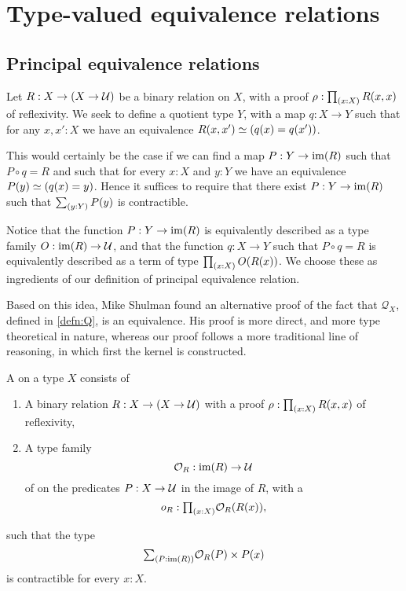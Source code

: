 \chapter{Type-valued equivalence relations}

\section{Principal equivalence relations}

Let $R: X\to (X\to\mathcal{U})$ be a binary relation on $X$, with a proof $\rho:\prd{x:X}R(x,x)$ of reflexivity. We seek to define a quotient type $Y$, with a map $q : X\to Y$ such that for any $x,x':X$ we have an equivalence $\eqv{R(x,x')}{(q(x)=q(x'))}$. 

This would certainly be the case if we can find a map $P:Y\to\operatorname{im}(R)$ such that $P\circ q=R$ and such that for every $x:X$ and $y:Y$ we have an equivalence $\eqv{P(y)}{(q(x)=y)}$. Hence it suffices to require that there exist $P:Y\to\operatorname{im}(R)$ such that $\sm{y:Y}P(y)$ is contractible. 

Notice that the function $P:Y\to\operatorname{im}(R)$ is equivalently described as a type family $O:\operatorname{im}(R)\to\mathcal{U}$, and that the function $q:X\to Y$ such that $P\circ q=R$ is equivalently described as a term of type $\prd{x:X} O(R(x))$. We choose these as ingredients of our definition of principal equivalence relation.

Based on this idea, Mike Shulman found an alternative proof of the fact that $\mathcal{Q}_X$, defined in \autoref{defn:Q}, is an equivalence. His proof is more direct, and more type theoretical in nature, whereas our proof follows a more traditional line of reasoning, in which first the kernel is constructed.

\begin{defn}
A  on a type $X$ consists of
\begin{enumerate}
\item A binary relation $R:X\to (X\to \mathcal{U})$ with a proof $\rho:\prd{x:X}R(x,x)$ of reflexivity,
\item A type family
\begin{equation*}
\mathcal{O}_R : \operatorname{im}(R)\to\mathcal{U} \\
\end{equation*}
of  on the predicates $P:X\to \mathcal{U}$ in the image of $R$, with a 
\begin{equation*}
o_R : \prd{x:X}\mathcal{O}_R(R(x)),
\end{equation*}
\end{enumerate}
such that the type
\begin{equation*}
\sm{P:\im(R)}\mathcal{O}_R(P)\times P(x)
\end{equation*}
is contractible for every $x:X$. 
\end{defn}


